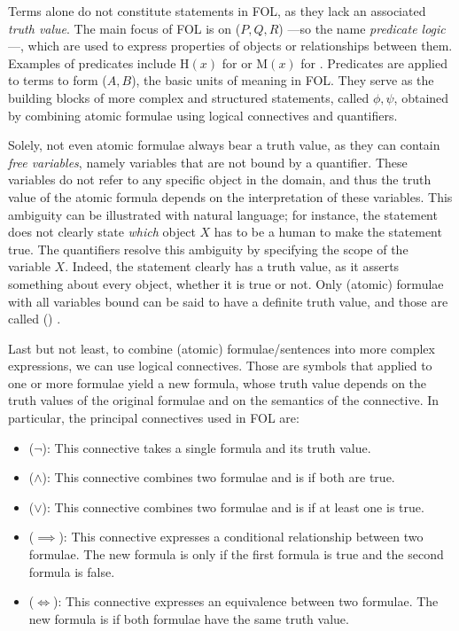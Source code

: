 Terms alone do not constitute statements in FOL, as they lack an associated \emph{truth value}.
The main focus of FOL is on  (\(P,Q,R\)) ---so the name \emph{predicate logic}---, which are used to express properties of objects or relationships between them.
Examples of predicates include \(\text{H}(x)\) for  or \(\text{M}(x)\) for .
Predicates are applied to terms to form  (\(A,B\)), the basic units of meaning in FOL\@. They serve as the building blocks of more complex and structured statements, called  \(\phi, \psi\), obtained by combining atomic formulae using logical connectives and quantifiers.

Solely, not even atomic formulae always bear a truth value, as they can contain \emph{free variables}, namely variables that are not bound by a quantifier. These variables do not refer to any specific object in the domain, and thus the truth value of the atomic formula depends on the interpretation of these variables.
This ambiguity can be illustrated with natural language; for instance, the statement  does not clearly state \emph{which} object \(X\) has to be a human to make the statement true.
The quantifiers resolve this ambiguity by specifying the scope of the variable \(X\). Indeed, the statement  clearly has a truth value, as it asserts something about every object, whether it is true or not.
Only (atomic) formulae with all variables bound can be said to have a definite truth value, and those are called () .

Last but not least, to combine (atomic) formulae/sentences into more complex expressions, we can use logical connectives. Those are symbols that applied to one or more formulae yield a new formula, whose truth value depends on the truth values of the original formulae and on the semantics of the connective.
In particular, the principal connectives used in FOL are:

\begin{itemize}
  \item {} (\(\neg\)): This connective takes a single formula and  its truth value.
  \item {} (\(\land\)): This connective combines two formulae and is  if both are true.
  \item {} (\(\lor\)): This connective combines two formulae and is  if at least one is true.
  \item {} (\(\implies\)): This connective expresses a conditional relationship between two formulae. The new formula is  only if the first formula is true and the second formula is false.
  \item {} (\(\iff\)): This connective expresses an equivalence between two formulae. The new formula is  if both formulae have the same truth value.
\end{itemize}

